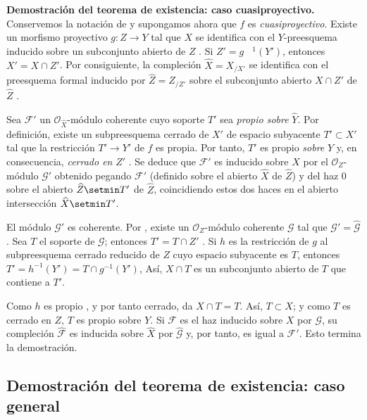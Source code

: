 \begin{env}[5.2.6]
\label{III.5.2.6}
\label{III.5.2.6-fr}
\textbf{Demostración del teorema de existencia: caso cuasiproyectivo.}
Conservemos la notación de  y supongamos ahora que $f$
es \emph{cuasiproyectivo}. Existe un morfismo proyectivo
$g:Z\to Y$ tal que $X$ se identifica con el $Y$-preesquema
inducido sobre un subconjunto abierto de $Z$ . Si
$Z'=g^{\phantom{-}1}(Y')$, entonces $X'=X\cap Z'$. Por consiguiente, la compleción
$\widehat X=X_{/X'}$ se identifica con el preesquema formal
inducido por $\widehat Z=Z_{/Z'}$ sobre el subconjunto abierto $X\cap Z'$ de
$\widehat Z$ .

Sea $\mathcal F'$ un $\mathcal O_{\widehat X}$-módulo coherente cuyo
soporte $T'$ sea \emph{propio sobre} $\widehat Y$. Por definición, existe
un subpreesquema cerrado de $X'$ de espacio subyacente
$T'\subset X'$ tal que la restricción $T'\to Y'$ de $f$ es
propia. Por tanto, $T'$ es propio \emph{sobre} $Y$ y, en consecuencia, \emph{cerrado en}
$Z'$ . Se deduce que $\mathcal F'$ es inducido
sobre $\widehat X$ por el $\mathcal O_Z$-módulo $\mathcal G'$
obtenido pegando $\mathcal F'$ (definido sobre el abierto $\widehat X$ de $\widehat Z$) y
del haz $0$ sobre el abierto $\widehat Z\setmin T'$ de $\widehat Z$, coincidiendo estos dos haces
en el abierto intersección $\widehat X\setmin T'$.

El módulo $\mathcal G'$ es coherente. Por , existe un
$\mathcal O_Z$-módulo coherente $\mathcal G$ tal que
$\mathcal G'=\widehat{\mathcal G}$. Sea $T$ el soporte de $\mathcal G$;
entonces $T'=T\cap Z'$ . Si $h$ es la restricción
de $g$ al subpreesquema cerrado reducido de $Z$ cuyo espacio subyacente
es $T$, entonces
$T'=h^{-1}(Y')=T\cap g^{-1}(Y')$,
Así, $X\cap T$ es un subconjunto abierto de $T$ que contiene a $T'$.

Como $h$ es propio , y por tanto cerrado,
 da $X\cap T=T$. Así, $T\subset X$; y
como $T$ es cerrado en $Z$, $T$ es propio sobre $Y$. Si $\mathcal F$ es
el haz inducido sobre $X$ por $\mathcal G$, su compleción
$\widehat{\mathcal F}$ es inducida sobre $\widehat X$ por
$\widehat{\mathcal G}$  y, por tanto, es igual a
$\mathcal F'$. Esto termina la demostración.
\end{env}


\subsection{Demostración del teorema de existencia: caso general}
\label{subsection:III.5.3}
\label{subsection:III.5.3-fr}

